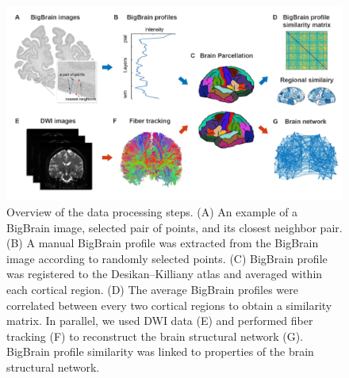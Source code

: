 \begin{refsection}
\begin{figure}[h]
  \includegraphics[width=\linewidth]{images/thesis_bb_fig1.jpg}
  \caption{Overview of the data processing steps. (A) An example of a BigBrain image, selected pair of points, and its closest neighbor pair. (B) A manual BigBrain profile was extracted from the BigBrain image according to randomly selected points. (C) BigBrain profile was registered to the Desikan–Killiany atlas and averaged within each cortical region. (D) The average BigBrain profiles were correlated between every two cortical regions to obtain a similarity matrix. In parallel, we used DWI data (E) and performed fiber tracking (F) to reconstruct the brain structural network (G). BigBrain profile similarity was linked to properties of the brain structural network.}
  \label{bigbrainFig1}
\end{figure}


\end{refsection}
